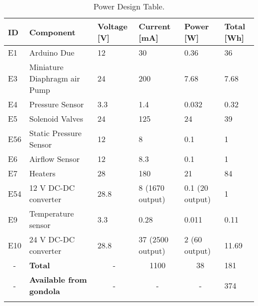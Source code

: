

\begin{longtable}{|m{}| m{} |m{} |m{}|m{}| m{} |}
\hline
\textbf{ID}             & \textbf{Component}                                                   & \textbf{Voltage {[}V{]}} & \textbf{Current {[}mA{]}} & \textbf{Power {[}W{]}} & \textbf{Total {[}Wh{]}} \\ \hline
E1 & Arduino Due & 12& 30  & 0.36  & 36  \\ \hline
E3 & Miniature Diaphragm air Pump & 24 & 200 & 7.68 & 7.68 \\ \hline
E4  & Pressure Sensor  & 3.3 & 1.4 & 0.032 & 0.32  \\ \hline
E5  & Solenoid Valves & 24 & 125 & 24  & 39 \\ \hline
E56 & Static Pressure Sensor & 12  & 8   & 0.1 & 1 \\ \hline
E6 & Airflow Sensor & 12  & 8.3   & 0.1 & 1 \\ \hline

E7   &  Heaters & 28 & 180  & 21 & 84 \\ \hline
E54  & 12 V DC-DC converter  & 28.8   & 8 (1670 output) & 0.1 (20 output) & 1 \\ \hline
E9  & Temperature sensor & 3.3 & 0.28 & 0.011  & 0.11   \\ \hline




E10  & 24 V DC-DC converter   & 28.8   & 37 (2500 output) & 2 (60 output) & 11.69 \\ \hline
\multicolumn{1}{|c|}{-} & \textbf{Total}                                  & \multicolumn{1}{c|}{-}                      & \multicolumn{1}{c|}{1100}                    & \multicolumn{1}{c|}{38}                 & 181                                        \\ \hline
\multicolumn{1}{|c|}{-} & \textbf{Available from gondola}                 & \multicolumn{1}{c|}{-}                      & \multicolumn{1}{c|}{-}                       & \multicolumn{1}{c|}{-}                    & 374                                        \\ \hline

\caption{Power Design Table.}
\label{tab:power-design-table}
\end{longtable}
\raggedbottom

